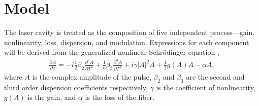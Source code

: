\documentclass[12pt]{article}
\title{}
\author{Brady Metherall}
\newcommand{\pdiff}[3][]{\frac{\partial^{#1}#2}{\partial{#3}^{#1}}}
\begin{document}
\maketitle

\section{Model}
The laser cavity is treated as the composition of five independent process---gain, nonlinearity, loss, dispersion, and modulation. Expressions for each component will be derived from the  generalized nonlinear Schr\"{o}dinger equation \cite{agrawal2013, ferreira, shtyrina, yarutkina},
\begin{align}
\label{eq:nlse}
\pdiff{A}{z} = - i \frac{1}{2} \beta_2 \pdiff[2]{A}{T} + \frac{1}{6} \beta_3 \pdiff[3]{A}{T} + i \gamma |A|^2 A + \frac{1}{2}g(A) A - \alpha A,
\end{align}
where $A$ is the complex amplitude of the pulse, $\beta_2$ and $\beta_3$ are the second and third order dispersion coefficients respectively, $\gamma$ is the coefficient of nonlinearity, $g(A)$ is the gain, and $\alpha$ is the loss of the fiber.
\end{document}
